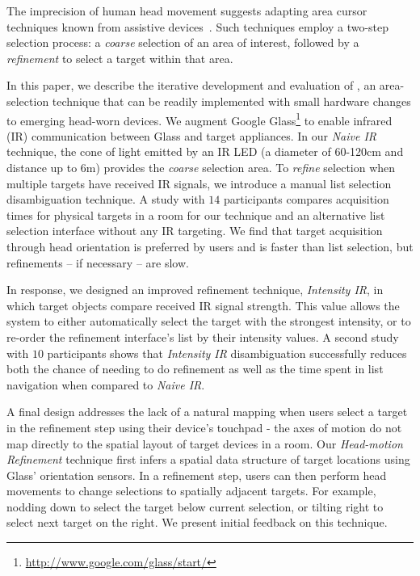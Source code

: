 The imprecision of human head movement suggests adapting area cursor techniques known from assistive devices~\cite{kabbash1995prince,worden1997making,findlater2010enhanced}. Such techniques employ a two-step selection process: a {\em coarse} selection of an area of interest, followed by a {\em refinement} to select a target within that area.

In this paper, we describe the iterative development and evaluation of \systemnamenospace, an area-selection technique that can be readily implemented with small hardware changes to emerging head-worn devices. We augment Google Glass\footnote{\url{http://www.google.com/glass/start/}} to enable infrared (IR) communication between Glass and target appliances. In our {\em Naive IR} technique, the cone of light emitted by an IR LED (a diameter of 60-120cm and distance up to 6m) provides the {\em coarse} selection area. To {\em refine} selection when multiple targets have received IR signals, we introduce a manual list selection disambiguation technique. A study with $14$ participants compares acquisition times for physical targets in a room for our technique and an alternative list selection interface without any IR targeting. We find that target acquisition through head orientation is preferred by users and is faster than list selection, but refinements -- if necessary -- are slow.

In response, we designed an improved refinement technique, {\em Intensity IR}, in which target objects compare received IR signal strength. This value allows the system to either automatically select the target with the strongest intensity, or to re-order the refinement interface's list by their intensity values. A second study with $10$ participants shows that {\em Intensity IR} disambiguation successfully reduces both the chance of needing to do refinement as well as the time spent in list navigation when compared to {\em Naive IR}.

A final design addresses the lack of a natural mapping when users select a target in the refinement step using their device's touchpad - the axes of motion do not map directly to the spatial layout of target devices in a room. Our {\em Head-motion Refinement} technique first infers a spatial data structure of target locations using Glass' orientation sensors. In a refinement step, users can then perform head movements to change selections to spatially adjacent targets. For example, nodding down to select the target below current selection, or tilting right to select next target on the right. We present initial feedback on this technique.

